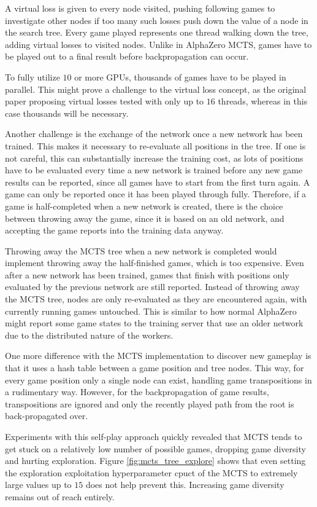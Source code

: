 \documentclass[12pt,onecolumn,oneside,titlepage]{article}
\begin{document}
A virtual loss is given to every node visited, pushing following games to investigate other nodes if too many such losses push down the value of a node in the search tree.
Every game played represents one thread walking down the tree, adding virtual losses to visited nodes. Unlike in AlphaZero MCTS, games have to be played out to a final result before backpropagation can occur. 

To fully utilize $10$ or more GPUs, thousands of games have to be played in parallel. This might prove a challenge to 
the virtual loss concept, as the original paper proposing virtual losses tested with only up to $16$ threads, whereas in this case thousands will be necessary.

Another challenge is the exchange of the network once a new network has been trained. 
This makes it necessary to re-evaluate all positions in the tree. If one is not careful, this can substantially increase the training cost, as
lots of positions have to be evaluated every time a new network is trained before any new game results can be reported, since all games have to start from the first turn again.
A game can only be reported once it has been played through fully.
Therefore, if a game is half-completed when a new network is created, there is the choice between throwing away the game, since it is based on an old network, and accepting the game reports into the training data anyway. 

Throwing away the MCTS tree when a new network 
is completed would implement throwing away the half-finished games, which is too expensive.
Even after a new network has been trained, games that finish with positions only evaluated by the previous network are still reported. Instead of throwing away the MCTS tree, nodes are only re-evaluated as they are encountered again,
with currently running games untouched.
This is similar to how normal AlphaZero might report some game states to the training server that use an older network due to the distributed nature of the workers.

One more difference with the MCTS implementation to discover new gameplay is that it uses a hash table between a game position and tree nodes.
This way, for every game position only a single node can exist, handling game transpositions in a rudimentary way. However, for 
the backpropagation of game results, transpositions are ignored and only the recently played path from the root is back-propagated over.

Experiments with this self-play approach quickly revealed that MCTS tends to get stuck on a relatively low number of possible games, dropping game diversity and hurting exploration. 
Figure \ref{fig:mcts_tree_explore} shows that even setting the exploration exploitation hyperparameter cpuct of the MCTS to extremely large values up to $15$ does not help prevent this.
Increasing game diversity remains out of reach entirely.
\end{document}
